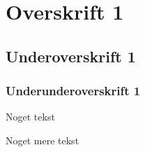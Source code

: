 \section{Overskrift 1}

\subsection{Underoverskrift 1}

\subsubsection{Underunderoverskrift 1}

Noget tekst

Noget mere tekst
